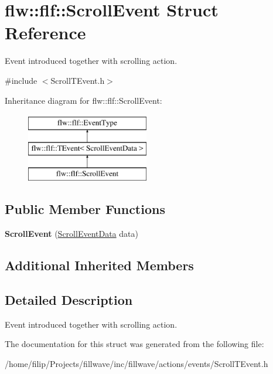 \hypertarget{classflw_1_1flf_1_1ScrollEvent}{}\section{flw\+:\+:flf\+:\+:Scroll\+Event Struct Reference}
\label{classflw_1_1flf_1_1ScrollEvent}


Event introduced together with scrolling action.  




{\ttfamily \#include $<$Scroll\+T\+Event.\+h$>$}

Inheritance diagram for flw\+:\+:flf\+:\+:Scroll\+Event\+:\begin{figure}[H]
\begin{center}
\leavevmode
\includegraphics[height=3.000000cm]{classflw_1_1flf_1_1ScrollEvent}
\end{center}
\end{figure}
\subsection*{Public Member Functions}
\begin{DoxyCompactItemize}
\item 
{\bfseries Scroll\+Event} (\hyperlink{structflw_1_1flf_1_1ScrollEventData}{Scroll\+Event\+Data} data)\hypertarget{classflw_1_1flf_1_1ScrollEvent_ad0525833753726b4c31faef987c873d7}{}\label{classflw_1_1flf_1_1ScrollEvent_ad0525833753726b4c31faef987c873d7}

\end{DoxyCompactItemize}
\subsection*{Additional Inherited Members}


\subsection{Detailed Description}
Event introduced together with scrolling action. 

The documentation for this struct was generated from the following file\+:\begin{DoxyCompactItemize}
\item 
/home/filip/\+Projects/fillwave/inc/fillwave/actions/events/Scroll\+T\+Event.\+h\end{DoxyCompactItemize}
